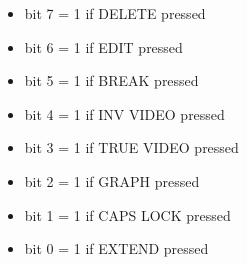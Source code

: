 \begin{itemize}
\item bit 7 = 1 if DELETE pressed
\item bit 6 = 1 if EDIT pressed
\item bit 5 = 1 if BREAK pressed
\item bit 4 = 1 if INV VIDEO pressed
\item bit 3 = 1 if TRUE VIDEO pressed
\item bit 2 = 1 if GRAPH pressed
\item bit 1 = 1 if CAPS LOCK pressed
\item bit 0 = 1 if EXTEND pressed
\end{itemize}
